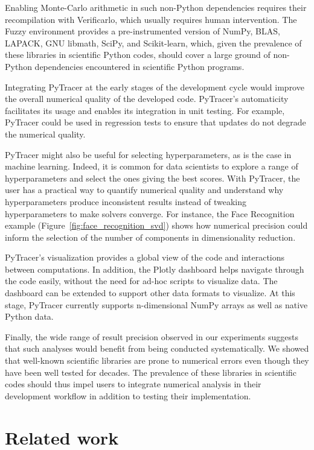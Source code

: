\documentclass[10pt,journal,compsoc]{IEEEtran}
\newcommand{\pytracer}[0]{PyTracer\xspace}
\begin{document}
Enabling Monte-Carlo arithmetic in such non-Python dependencies requires their
recompilation with Verificarlo, which usually requires human intervention. The
Fuzzy environment provides a pre-instrumented version of NumPy, BLAS, LAPACK,
GNU libmath, SciPy, and Scikit-learn, which, given the prevalence of these
libraries in scientific Python codes, should cover a large ground of non-Python
dependencies encountered in scientific Python programs.

Integrating \pytracer at the early stages of the development cycle would improve
the overall numerical quality of the developed code. \pytracer's automaticity
facilitates its usage and enables its integration in unit testing. For example,
\pytracer could be used in regression tests to ensure that updates do not
degrade the numerical quality.

\pytracer might also be useful for selecting hyperparameters, as is the case in
machine learning. Indeed, it is common for data scientists to explore a range of
hyperparameters and select the ones giving the best scores. With \pytracer, the
user has a practical way to quantify numerical quality and understand why
hyperparameters produce inconsistent results instead of tweaking hyperparameters
to make solvers converge. For instance, the Face Recognition example
(Figure~\ref{fig:face_recognition_svd}) shows how numerical precision could
inform the selection of the number of components in dimensionality reduction.

\pytracer's visualization provides a global view of the code and interactions
between computations. In addition, the Plotly dashboard helps navigate through
the code easily, without the need for ad-hoc scripts to visualize data. The
dashboard can be extended to support other data formats to visualize. At this
stage, \pytracer currently supports n-dimensional NumPy arrays as well as native
Python data.

Finally, the wide range of result precision observed in our experiments suggests
that such analyses would benefit from being conducted systematically. We showed
that well-known scientific libraries are prone to numerical errors even though
they have been well tested for decades. The prevalence of these libraries in
scientific codes should thus impel users to integrate numerical analysis in
their development workflow in addition to testing their implementation.

\section{Related work}
\end{document}
